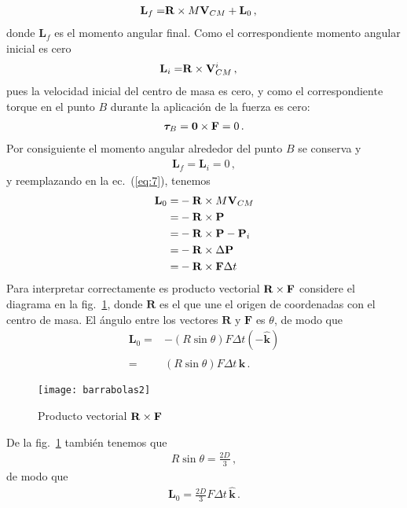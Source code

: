 \begin{itemize}
\begin{enumerate}
  \begin{align}
    \label{eq:7}
    \mathbf{L}_f=&\mathbf{R}\times M\mathbf{V}_{CM}+\mathbf{L}_0\,,
  \end{align}
donde $\mathbf{L}_f$ es el momento angular final. Como el correspondiente momento angular inicial es cero
\begin{align}
    \mathbf{L}_i=&\mathbf{R}\times \mathbf{V}_{CM}^i\,,
\end{align}
pues la velocidad inicial del centro de masa es cero, y como el correspondiente torque en el punto $B$ durante la  aplicación de la fuerza es cero:
\begin{align}
  \boldsymbol{\tau}_B=\mathbf{0}\times \mathbf{F}=0\,. 
\end{align}
Por consiguiente el momento angular alrededor del punto $B$ se conserva y
\begin{align}
  \mathbf{L}_f=\mathbf{L}_i=0\,,
\end{align}
y reemplazando en la ec.~(\ref{eq:7}), tenemos
\begin{align}
  \mathbf{L}_0=& -\mathbf{R}\times M\mathbf{V}_{CM}\nonumber\\
=& -\mathbf{R}\times \mathbf{P}\nonumber\\
=& -\mathbf{R}\times \mathbf{P}-\mathbf{P}_i\nonumber\\
=& -\mathbf{R}\times \Delta \mathbf{P}\nonumber\\
=& -\mathbf{R}\times \mathbf{F}\Delta t\nonumber\\
\end{align}
Para interpretar correctamente es producto vectorial $\mathbf{R}\times \mathbf{F}$ considere el diagrama en la fig.~\ref{fig:barrabolas2}, donde $\mathbf{R}$ es el que une el origen de coordenadas con el centro de masa. El ángulo entre los vectores $\mathbf{R}$ y $\mathbf{F}$ es $\theta$, de modo que
\begin{align}
  \mathbf{L}_0=&-(R \sin\theta)F \Delta t(-\hat{\mathbf{k}})\nonumber\\
=&(R \sin\theta)F \Delta t\,\hat{\mathbf{k}}\,.
\end{align}


\begin{figure}
  \centering
  \texttt{[image: barrabolas2]}
  \caption{Producto vectorial $\mathbf{R}\times \mathbf{F}$}
  \label{fig:barrabolas2}
\end{figure}

De la fig.~\ref{fig:barrabolas2} también tenemos que
\begin{align}
  R\sin\theta=\frac{2D}{3}\,,
\end{align}
de modo que
\begin{align}
\label{eq:8}
\mathbf{L}_0= \frac{2D}{3} F\Delta t\,\hat{\mathbf{k}}\,.
\end{align}


\end{enumerate}
\end{itemize}
